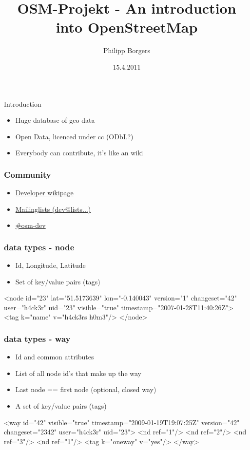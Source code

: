 \documentclass{beamer}
\title[OSM-Projekt - What is...]{OSM-Projekt - An introduction into OpenStreetMap}
\author{Philipp Borgers}
\institute{Institute for Computer Science, Free University Berlin}
\date{15.4.2011}
\begin{document}
\begin{frame}
\titlepage
\end{frame}

\begin{frame}{Introduction}
    \begin{itemize}
    \item Huge database of geo data
    \item Open Data, licenced under cc (ODbL?)
    \item Everybody can contribute, it's like an wiki
    \end{itemize}

\end{frame}

\begin{frame}[fragile]
    \frametitle{Community}
    \begin{itemize}
        \item \href{http://wiki.openstreetmap.org/wiki/Develop}{Developer wikipage}
        \item \href{http://lists.openstreetmap.org/listinfo}{Mailinglists (dev@lists...)}
        \item \href{irc://irc.oftc.net/#osm-dev}{\#osm-dev}
    \end{itemize}
\end{frame}

\begin{frame}[fragile]
    \frametitle{data types - node}
    \begin{itemize}
    \item Id, Longitude, Latitude
    \item Set of key/value pairs (tags)
    \end{itemize}
    \begin{xmlcode}
    <node id="23" lat="51.5173639" lon="-0.140043" version="1" changeset="42" user="h4ck3r" 
        uid="23" visible="true" timestamp="2007-01-28T11:40:26Z">
       <tag k="name" v="h4ck3rs h0m3"/>
    </node>
    \end{xmlcode}
\end{frame}

\begin{frame}[fragile]
    \frametitle{data types - way}
    \begin{itemize}
    \item Id and common attributes
    \item List of all node id's that make up the way
    \item Last node == first node (optional, closed way)
    \item A set of key/value pairs (tags)
    \end{itemize}
    \begin{xmlcode}
    <way id="42" visible="true" timestamp="2009-01-19T19:07:25Z" version="42" changeset="2342"
        user="h4ck3r" uid="23">
        <nd ref="1"/>
        <nd ref="2"/>
        <nd ref="3"/>
        <nd ref="1"/>
        <tag k="oneway" v="yes"/>
    </way>
    \end{xmlcode}
\end{frame}
\end{document}
